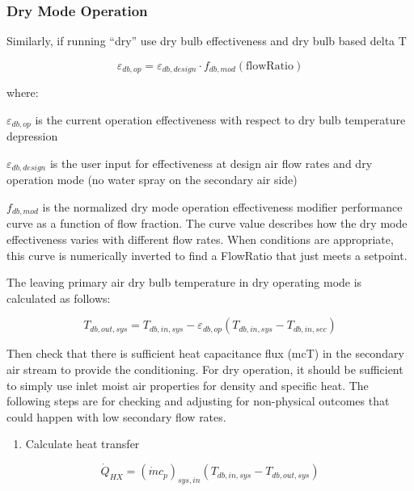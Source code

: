 \subsubsection{Dry Mode Operation}\label{dry-mode-operation}

Similarly, if running ``dry'' use dry bulb effectiveness and dry bulb based delta T

\begin{equation}
\varepsilon_{db,op} = \varepsilon_{db,design} \cdot f_{db,mod}\left(\text{flowRatio}\right)
\end{equation}

where:

\(\varepsilon_{db,op}\) is the current operation effectiveness with respect to dry bulb temperature depression

\(\varepsilon_{db,design}\) is the user input for effectiveness at design air flow rates and dry operation mode (no water spray on the secondary air side)

\(f_{db,mod}\) is the normalized dry mode operation effectiveness modifier performance curve as a function of flow fraction. The curve value describes how the dry mode effectiveness varies with different flow rates. When conditions are appropriate, this curve is numerically inverted to find a FlowRatio that just meets a setpoint.

The leaving primary air dry bulb temperature in dry operating mode is calculated as follows:

\begin{equation}
T_{db,out,sys} = T_{db,in,sys} - \varepsilon_{db,op}\left(T_{db,in,sys}-T_{db,in,sec}\right)
\label{eq:leavingprimaryairdrybulbtemp}
\end{equation}

Then check that there is sufficient heat capacitance flux (mcT) in the secondary air stream to provide the conditioning. For dry operation, it should be sufficient to simply use inlet moist air properties for density and specific heat. The following steps are for checking and adjusting for non-physical outcomes that could happen with low secondary flow rates.

\begin{enumerate}
\def\labelenumi{\arabic{enumi}.}
\tightlist
\item
  Calculate heat transfer
\end{enumerate}

\begin{equation}
\dot{Q}_{HX} = \left(\dot{m}c_{p}\right)_{sys,in} \left(T_{db,in,sys}-T_{db,out,sys}\right)
\label{eq:QdotHX}
\end{equation}


